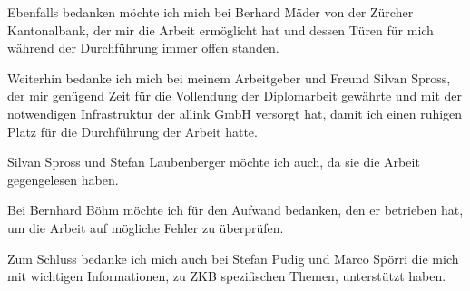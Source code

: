 Ebenfalls bedanken möchte ich mich bei Berhard Mäder von der Zürcher
Kantonalbank, der mir die Arbeit ermöglicht hat und dessen Türen für mich
während der Durchführung immer offen standen.
  
Weiterhin bedanke ich mich bei meinem Arbeitgeber und Freund Silvan Spross,
der mir genügend Zeit für die Vollendung der Diplomarbeit gewährte und mit der
notwendigen Infrastruktur der allink GmbH versorgt hat, damit ich einen
ruhigen Platz für die Durchführung der Arbeit hatte.
  
Silvan Spross und Stefan Laubenberger möchte ich auch, da sie die Arbeit
gegengelesen haben.

Bei Bernhard Böhm möchte ich für den Aufwand bedanken, den er betrieben hat, um
die Arbeit auf mögliche Fehler zu überprüfen.
  
Zum Schluss bedanke ich mich auch bei Stefan Pudig und Marco Spörri die
mich mit wichtigen Informationen, zu \ac{ZKB} spezifischen Themen, unterstützt
haben.
